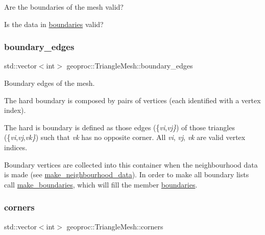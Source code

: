 Are the boundaries of the mesh valid? 

Is the data in \hyperlink{classgeoproc_1_1TriangleMesh_a57162eac37831c87786a8dab8331d72f}{boundaries} valid? \mbox{\label{classgeoproc_1_1TriangleMesh_a142a764ddf07b98c7efcd596d88c3f87}} 
\subsubsection{\texorpdfstring{boundary\+\_\+edges}{boundary\_edges}}
{\footnotesize\ttfamily std\+::vector$<$int$>$ geoproc\+::\+Triangle\+Mesh\+::boundary\+\_\+edges\hspace{0.3cm}{\ttfamily [protected]}}



Boundary edges of the mesh. 

The hard boundary is composed by pairs of vertices (each identified with a vertex index).

The hard is boundary is defined as those edges (\{{\itshape vi},{\itshape vj\}}) of those triangles (\{{\itshape vi},{\itshape vj},{\itshape vk\}}) such that {\itshape vk} has no opposite corner. All {\itshape vi}, {\itshape vj}, {\itshape vk} are valid vertex indices.

Boundary vertices are collected into this container when the neighbourhood data is made (see \hyperlink{classgeoproc_1_1TriangleMesh_a84003dfdfd5e591c00f01a797578ff1f}{make\+\_\+neighbourhood\+\_\+data}). In order to make all boundary lists call \hyperlink{classgeoproc_1_1TriangleMesh_ad11c9406e2677e4d72d53837206fd769}{make\+\_\+boundaries}, which will fill the member \hyperlink{classgeoproc_1_1TriangleMesh_a57162eac37831c87786a8dab8331d72f}{boundaries}. \mbox{\label{classgeoproc_1_1TriangleMesh_ab9610d614e081deb28010d237fecd55b}} 
\subsubsection{\texorpdfstring{corners}{corners}}
{\footnotesize\ttfamily std\+::vector$<$int$>$ geoproc\+::\+Triangle\+Mesh\+::corners\hspace{0.3cm}{\ttfamily [protected]}}



